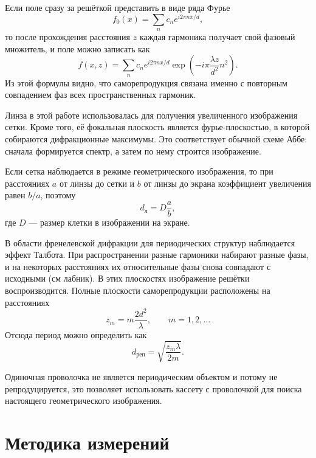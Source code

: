 \documentclass[twoside]{mfitjournal}
\begin{document}
Если поле сразу за решёткой представить в виде ряда Фурье
\begin{equation}
f_0(x) = \sum\limits_n c_n e^{i 2\pi n x/d},
\end{equation}
то после прохождения расстояния $z$ каждая гармоника получает свой фазовый множитель, и поле можно записать как
\begin{equation}
f(x,z) = \sum\limits_n c_n e^{i 2\pi n x/d}\exp\left(-i\pi\frac{\lambda z}{d^2}n^2\right).
\end{equation}
Из этой формулы видно, что саморепродукция связана именно с повторным совпадением фаз всех пространственных гармоник.

Линза в этой работе использовалась для получения увеличенного изображения сетки. Кроме того, её фокальная плоскость является фурье-плоскостью, в которой собираются дифракционные максимумы. Это соответствует обычной схеме Аббе: сначала формируется спектр, а затем по нему строится изображение.

Если сетка наблюдается в режиме геометрического изображения, то при расстояниях $a$ от линзы до сетки и $b$ от линзы до экрана коэффициент увеличения равен $b/a$, поэтому
\begin{equation}
d_{\text{л}} = D\frac{a}{b},
\end{equation}
где $D$ --- размер клетки в изображении на экране.

В области френелевской дифракции для периодических структур наблюдается эффект Талбота. При распространении разные гармоники набирают разные фазы, и на некоторых расстояниях их относительные фазы снова совпадают с исходными (см лабник). В этих плоскостях изображение решётки воспроизводится. Полные плоскости саморепродукции расположены на расстояниях
\begin{equation}
z_m = m\frac{2d^2}{\lambda}, \qquad m = 1,2,\ldots
\end{equation}
Отсюда период можно определить как
\begin{equation}
d_{\text{реп}} = \sqrt{\frac{z_m\lambda}{2m}}.
\end{equation}

Одиночная проволочка не является периодическим объектом и потому не репродуцируется, это позволяет использовать кассету с проволочкой для поиска настоящего геометрического изображения.

\section*{Методика измерений}
\end{document}
